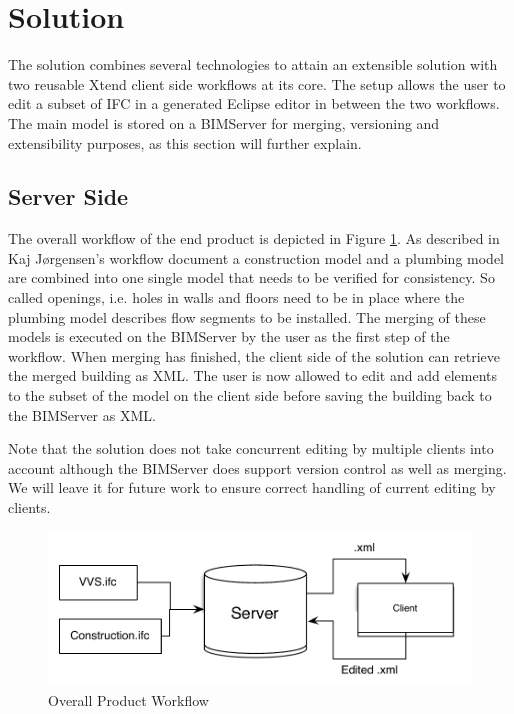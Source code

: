 \section{Solution}
The solution combines several technologies to attain an extensible solution with two reusable Xtend client side workflows at its core. The setup allows the user to edit a subset of IFC in a generated Eclipse editor in between the two workflows. The main model is stored on a BIMServer for merging, versioning and extensibility purposes, as this section will further explain.

\subsection{Server Side}
The overall workflow of the end product is depicted in Figure \ref{fig:overall_product_workflow}. As described in Kaj Jørgensen's workflow document\cite{jorgensen12} a construction model and a plumbing model are combined into one single model that needs to be verified for consistency. So called openings, i.e. holes in walls and floors need to be in place where the plumbing model describes flow segments to be installed. The merging of these models is executed on the BIMServer by the user as the first step of the workflow.\cite{bimserver} When merging has finished, the client side of the solution can retrieve the merged building as XML. The user is now allowed to edit and add elements to the subset of the model on the client side before saving the building back to the BIMServer as XML.

Note that the solution does not take concurrent editing by multiple clients into account although the BIMServer does support version control as well as merging. We will leave it for future work to ensure correct handling of current editing by clients.

\begin{figure}[htbp]
    \centering
        \includegraphics[width=120mm]{images/CompleteWorkflow.pdf}
    \caption{Overall Product Workflow}
    \label{fig:overall_product_workflow}
\end{figure}

